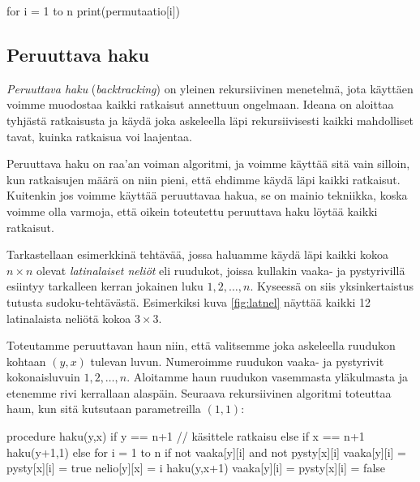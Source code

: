 \begin{code}
for i = 1 to n
    print(permutaatio[i])
\end{code}

\subsection{Peruuttava haku}


\emph{Peruuttava haku} (\emph{backtracking}) on yleinen rekursiivinen menetelmä,
jota käyttäen voimme muodostaa kaikki ratkaisut
annettuun ongelmaan.
Ideana on aloittaa tyhjästä ratkaisusta ja käydä
joka askeleella läpi rekursiivisesti kaikki mahdolliset tavat,
kuinka ratkaisua voi laajentaa.

Peruuttava haku on raa'an voiman algoritmi,
ja voimme käyttää sitä vain silloin,
kun ratkaisujen määrä on niin pieni,
että ehdimme käydä läpi kaikki ratkaisut.
Kuitenkin jos voimme käyttää peruuttavaa hakua,
se on mainio tekniikka,
koska voimme olla varmoja, että oikein toteutettu
peruuttava haku löytää kaikki ratkaisut.


Tarkastellaan esimerkkinä tehtävää, jossa haluamme käydä läpi
kaikki kokoa $n \times n$ olevat \emph{latinalaiset neliöt}
eli ruudukot, joissa kullakin vaaka- ja pystyrivillä
esiintyy tarkalleen kerran jokainen luku $1,2,\dots,n$.
Kyseessä on siis yksinkertaistus tutusta sudoku-tehtävästä.
Esimerkiksi kuva \ref{fig:latnel} näyttää kaikki 12 latinalaista neliötä kokoa $3 \times 3$.

Toteutamme peruuttavan haun niin, että valitsemme joka askeleella
ruudukon kohtaan $(y,x)$ tulevan luvun.
Numeroimme ruudukon vaaka- ja pystyrivit kokonaisluvuin $1,2,\dots,n$.
Aloitamme haun ruudukon vasemmasta yläkul\-masta ja etenemme
rivi kerrallaan alaspäin.
Seuraava rekursiivinen algoritmi toteuttaa haun,
kun sitä kutsutaan parametreilla $(1,1)$:

\begin{code}
procedure haku(y,x)
    if y == n+1
        // käsittele ratkaisu
    else if x == n+1
        haku(y+1,1)
    else
        for i = 1 to n
            if not vaaka[y][i] and not pysty[x][i]
                vaaka[y][i] = pysty[x][i] = true
                nelio[y][x] = i
                haku(y,x+1)
                vaaka[y][i] = pysty[x][i] = false
\end{code}


